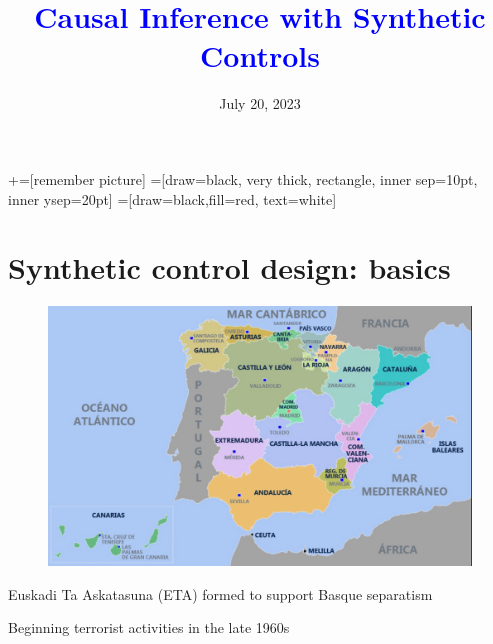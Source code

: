 \documentclass[notes,11pt, aspectratio=169]{beamer}
\title[]{\textcolor{blue}{Causal Inference with Synthetic Controls}}
\institute[GSB]{\small{\begin{tabular}{c}
Alexander J. Almeida \\
Stanford Graduate School of Business\\
\end{tabular}}}
\date{July 20, 2023}
\newenvironment{wideitemize}{\itemize\addtolength{\itemsep}{10pt}}{\enditemize}
\begin{document}
\newcommand\marktopleft[1]{%
    \tikz[overlay,remember picture] 
        \node (marker-#1-a) at (-.3em,.3em) {};%
}
\newcommand\markbottomright[2]{%
    \tikz[overlay,remember picture] 
        \node (marker-#1-b) at (0em,0em) {};%
}
+=[remember picture] 
 =[draw=black, very thick, rectangle, inner sep=10pt, inner ysep=20pt]
 =[draw=black,fill=red, text=white]

\begin{frame}
\maketitle
\end{frame}

\section{Synthetic control design: basics}

\begin{frame}{}
    \begin{figure}
        \includegraphics[width = .7\linewidth]{figures/mapa.png}
    \end{figure}
\end{frame}

\begin{frame}{}
    \begin{wideitemize}
        \item Euskadi Ta Askatasuna (ETA) formed to support Basque separatism
        \item Beginning terrorist activities in the late 1960s
    \end{wideitemize}
\end{frame}
\end{document}
